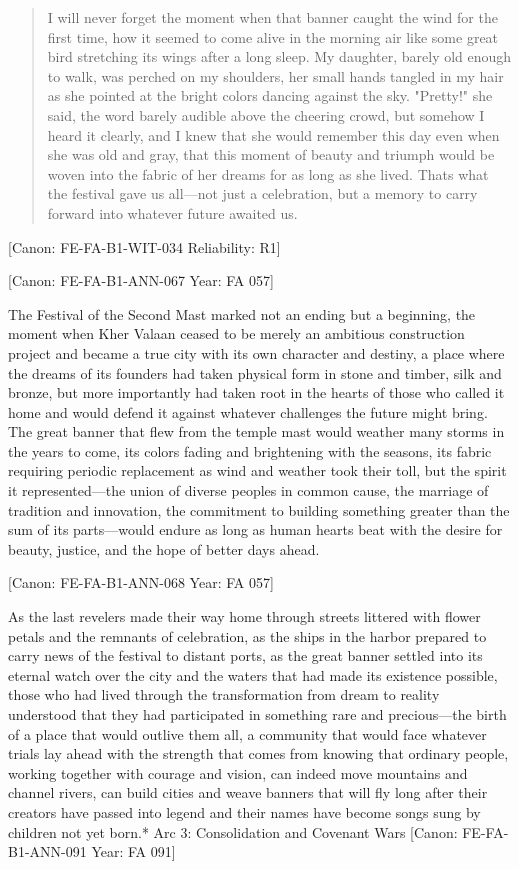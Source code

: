 \begin{quote}
I will never forget the moment when that banner caught the wind for the
first time, how it seemed to come alive in the morning air like some
great bird stretching its wings after a long sleep. My daughter, barely
old enough to walk, was perched on my shoulders, her small hands tangled
in my hair as she pointed at the bright colors dancing against the sky.
"Pretty!" she said, the word barely audible above the cheering crowd,
but somehow I heard it clearly, and I knew that she would remember this
day even when she was old and gray, that this moment of beauty and
triumph would be woven into the fabric of her dreams for as long as she
lived. That\textquotesingle s what the festival gave us all---not just a
celebration, but a memory to carry forward into whatever future awaited
us.
\end{quote}

{[}Canon: FE-FA-B1-WIT-034 \textbar{} Reliability: R1{]}

{[}Canon: FE-FA-B1-ANN-067 \textbar{} Year: FA 057{]}

The Festival of the Second Mast marked not an ending but a beginning,
the moment when Kher Valaan ceased to be merely an ambitious
construction project and became a true city with its own character and
destiny, a place where the dreams of its founders had taken physical
form in stone and timber, silk and bronze, but more importantly had
taken root in the hearts of those who called it home and would defend it
against whatever challenges the future might bring. The great banner
that flew from the temple mast would weather many storms in the years to
come, its colors fading and brightening with the seasons, its fabric
requiring periodic replacement as wind and weather took their toll, but
the spirit it represented---the union of diverse peoples in common
cause, the marriage of tradition and innovation, the commitment to
building something greater than the sum of its parts---would endure as
long as human hearts beat with the desire for beauty, justice, and the
hope of better days ahead.

{[}Canon: FE-FA-B1-ANN-068 \textbar{} Year: FA 057{]}

As the last revelers made their way home through streets littered with
flower petals and the remnants of celebration, as the ships in the
harbor prepared to carry news of the festival to distant ports, as the
great banner settled into its eternal watch over the city and the waters
that had made its existence possible, those who had lived through the
transformation from dream to reality understood that they had
participated in something rare and precious---the birth of a place that
would outlive them all, a community that would face whatever trials lay
ahead with the strength that comes from knowing that ordinary people,
working together with courage and vision, can indeed move mountains and
channel rivers, can build cities and weave banners that will fly long
after their creators have passed into legend and their names have become
songs sung by children not yet born.* Arc 3: Consolidation and Covenant
Wars {[}Canon: FE-FA-B1-ANN-091 \textbar{} Year: FA 091{]}

